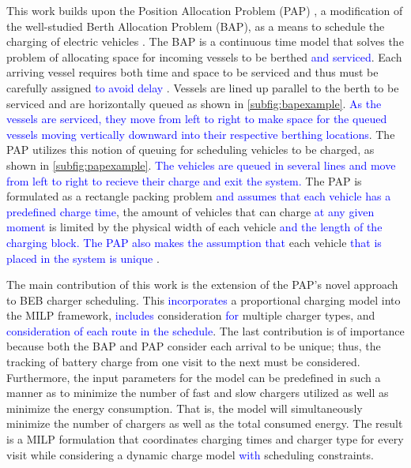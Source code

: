 \documentclass[utf8]{FrontiersinHarvard}
\let\cite\citep                                       %
\begin{document}
This work builds upon the Position Allocation Problem (PAP) \cite{qarebagh-2019-optim-sched}, a modification of the
well-studied Berth Allocation Problem (BAP), as a means to schedule the charging of electric vehicles
\cite{buhrkal-2011-model-discr,frojan-2015-contin-berth,imai-2001-dynam-berth}. The BAP is a continuous time model
that solves the problem of allocating space for incoming vessels to be berthed \textcolor{blue}{and serviced}. Each
arriving vessel requires both time and space to be serviced and thus must be carefully assigned \textcolor{blue}{to avoid delay} \cite{imai-2001-dynam-berth}. Vessels are lined up parallel to the berth to be serviced and are horizontally
queued as shown in \autoref{subfig:bapexample}. \textcolor{blue}{As the vessels are serviced, they move from left to right to make space for the queued vessels moving vertically downward into their respective berthing locations}. The PAP
utilizes this notion of queuing for scheduling vehicles to be charged, as shown in \autoref{subfig:papexample}.
\textcolor{blue}{The vehicles are queued in several lines and move from left to right to recieve their charge and exit the system.} The PAP is formulated as a rectangle packing problem \textcolor{blue}{and assumes that each vehicle has a predefined charge time}, the amount of vehicles that can charge \textcolor{blue}{at any given moment} is limited by the
physical width of each vehicle \textcolor{blue}{and the length of the charging block. The PAP also makes the assumption that} each vehicle \textcolor{blue}{that is placed in the system is unique} \cite{qarebagh-2019-optim-sched}.

The main contribution of this work is the extension of the PAP's novel approach to BEB charger scheduling. This
\textcolor{blue}{incorporates} a proportional charging model into the MILP framework,
\textcolor{blue}{includes} consideration \textcolor{blue}{for} multiple charger types, and
\textcolor{blue}{consideration of each route in the schedule}. The last contribution is of importance because
both the BAP and PAP consider each arrival to be unique; thus, the tracking of battery charge from one visit to the next
must be considered. Furthermore, the input parameters for the model can be predefined in such a manner as to minimize
the number of fast and slow chargers utilized as well as minimize the energy consumption. That is, the model will
simultaneously minimize the number of chargers as well as the total consumed energy. The result is a MILP formulation
that coordinates charging times and charger type for every visit while considering a dynamic charge model
\textcolor{blue}{with} scheduling constraints.
\end{document}
